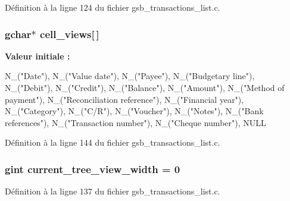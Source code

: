Définition à la ligne 124 du fichier gsb\_\-transactions\_\-list.c.

\subsubsection[{cell\_\-views}]{\setlength{\rightskip}{0pt plus 5cm}gchar$\ast$ {\bf cell\_\-views}[$\,$]}\label{gsb__transactions__list_8c_aa9959039948028badde16d39e1a74c43}
{\bfseries Valeur initiale :}
\begin{DoxyCode}
 {
    N_("Date"),
    N_("Value date"),
    N_("Payee"),
    N_("Budgetary line"),
    N_("Debit"),
    N_("Credit"),
    N_("Balance"),
    N_("Amount"),
    N_("Method of payment"),
    N_("Reconciliation reference"),
    N_("Financial year"),
    N_("Category"),
    N_("C/R"),
    N_("Voucher"),
    N_("Notes"),
    N_("Bank references"),
    N_("Transaction number"),
    N_("Cheque number"),
    NULL }
\end{DoxyCode}


Définition à la ligne 144 du fichier gsb\_\-transactions\_\-list.c.

\subsubsection[{current\_\-tree\_\-view\_\-width}]{\setlength{\rightskip}{0pt plus 5cm}gint {\bf current\_\-tree\_\-view\_\-width} = 0}\label{gsb__transactions__list_8c_a265408c8482c4045a6e5e022d89696ba}


Définition à la ligne 137 du fichier gsb\_\-transactions\_\-list.c.


